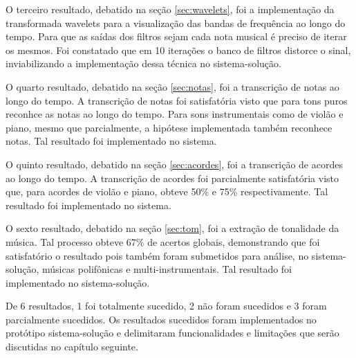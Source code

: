 O terceiro resultado, debatido na seção \ref{sec:wavelets}, foi a implementação da transformada wavelets para a visualização das bandas de frequência ao longo do tempo. Para que as saídas dos filtros sejam cada nota musical é preciso de iterar os mesmos. Foi constatado que em 10 iterações o banco de filtros distorce o sinal, inviabilizando a implementação dessa técnica no sistema-solução.

O quarto resultado, debatido na seção \ref{sec:notas}, foi a transcrição de notas ao longo do tempo. A transcrição de notas foi satisfatória visto que para tons puros reconhce as notas ao longo do tempo. Para sons instrumentais como de violão e piano, mesmo que parcialmente, a hipótese implementada também reconhece notas. Tal resultado foi implementado no sistema.

O quinto resultado, debatido na seção \ref{sec:acordes}, foi a transcrição de acordes ao longo do tempo. A transcrição de acordes foi parcialmente satisfatória visto que, para acordes de violão e piano, obteve 50\% e 75\% respectivamente. Tal resultado foi implementado no sistema.

O sexto resultado, debatido na seção \ref{sec:tom}, foi a extração de tonalidade da música. Tal processo obteve 67\% de acertos globais, demonstrando que foi satisfatório o resultado pois também foram submetidos para análise, no sistema-solução, músicas polifônicas e multi-instrumentais. Tal resultado foi implementado no sistema-solução.

De 6 resultados, 1 foi totalmente sucedido, 2 não foram sucedidos e 3 foram parcialmente sucedidos. Os resultados sucedidos foram implementados no protótipo sistema-solução e delimitaram funcionalidades e limitações que serão discutidas no capítulo seguinte.
